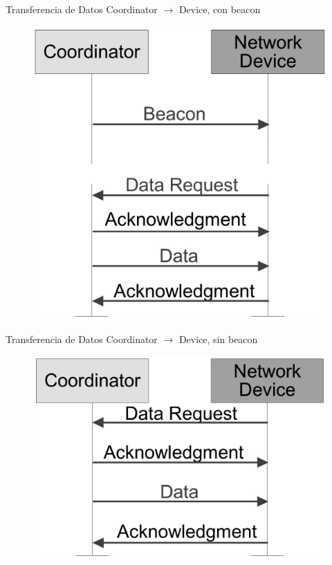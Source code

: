 \documentclass[aspectratio=169]{beamer}
\begin{document}
\begin{frame}[t]{Transferencia de Datos}
\vspace{0px}
Coordinator $\rightarrow$ Device, con beacon
\vspace{10px}
	\begin{figure}[H]
		\includegraphics[height=.71\textheight]{./imagenes/coord-dev-beacon.jpg}
	\end{figure}	  	  	
\end{frame}

\begin{frame}[t]{Transferencia de Datos}
\vspace{0px}
Coordinator $\rightarrow$ Device, sin beacon
\vspace{10px}
	\begin{figure}[H]
		\includegraphics[height=.5\textheight]{./imagenes/coord-dev-sinbeacon.jpg}
	\end{figure}	  	  	
\end{frame}
\end{document}

